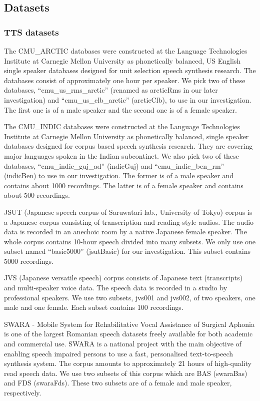 \documentclass[12pt]{article}
\begin{document}
\subsection{Datasets}

\subsubsection{TTS datasets}
The CMU\_ARCTIC databases \cite{cmrArctic} were constructed at the Language Technologies Institute at Carnegie Mellon University as phonetically balanced, US English single speaker databases designed for unit selection speech synthesis research. The databases consist of approximately one hour per speaker. We pick two of these databases, “cmu\_us\_rms\_arctic” (renamed as arcticRms in our later investigation) and “cmu\_us\_clb\_arctic” (arcticClb), to use in our investigation. The first one is of a male speaker and the second one is of a female speaker.

The CMU\_INDIC databases \cite{cmuIndic} were constructed at the Language Technologies Institute at Carnegie Mellon University as phonetically balanced, single speaker databases designed for corpus based speech synthesis research. They are covering major languages spoken in the Indian subcontinet. We also pick two of these databases, “cmu\_indic\_guj\_ad” (indicGuj) and “cmu\_indic\_ben\_rm” (indicBen) to use in our investigation. The former is of a male speaker and contains about 1000 recordings. The latter is of a female speaker and contains about 500 recordings.

JSUT (Japanese speech corpus of Saruwatari-lab., University of Tokyo) corpus \cite{jsut} is a Japanese corpus consisting of transcription and reading-style audios. The audio data is recorded in an anechoic room by a native Japanese female speaker. The whole corpus contains 10-hour speech divided into many subsets. We only use one subset named “basic5000” (jsutBasic) for our investigation. This subset contains 5000 recordings.

JVS (Japanese versatile speech) corpus \cite{jvs} consists of Japanese text (transcripts) and multi-speaker voice data. The speech data is recorded in a studio by professional speakers. We use two subsets, jvs001 and jvs002, of two speakers, one male and one female. Each subset contains 100 recordings.

SWARA - Mobile System for Rehabilitative Vocal Assistance of Surgical Aphonia \cite{swara} is one of the largest Romanian speech datasets freely available for both academic and commercial use. SWARA is a national project with the main objective of enabling speech impaired persons to use a fast, personalised text-to-speech synthesis system. The corpus amounts to approximately 21 hours of high-quality read speech data. We use two subsets of this corpus which are BAS (swaraBas) and FDS (swaraFds). These two subsets are of a female and male speaker, respectively.
\end{document}
